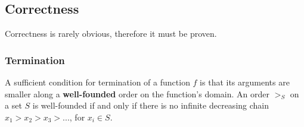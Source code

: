 \documentclass{ethz-assignment}
\begin{document}
\subsection{Correctness}
Correctness is rarely obvious, therefore it must be proven.

\subsubsection{Termination}
A sufficient condition for termination of a function $f$ is that its arguments are smaller along a \textbf{well-founded} order on the function's domain. An order $>_S$ on a set $S$ is well-founded if and only if there is no infinite decreasing chain $x_1 > x_2 > x_3 > ...$, for $x_i \in S$.





\end{document}

